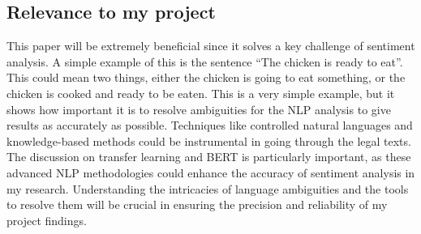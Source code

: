 \subsection{Relevance to my project}
This paper will be extremely beneficial since it solves a key challenge of sentiment analysis. A simple example of this is the sentence ``The chicken is ready to eat''. This could mean two things, either the chicken is going to eat something, or the chicken is cooked and ready to be eaten. This is a very simple example, but it shows how important it is to resolve ambiguities for the NLP analysis to give results as accurately as possible. Techniques like controlled natural languages and knowledge-based methods could be instrumental in going through the legal texts. The discussion on transfer learning and BERT is particularly important, as these advanced NLP methodologies could enhance the accuracy of sentiment analysis in my research. Understanding the intricacies of language ambiguities and the tools to resolve them will be crucial in ensuring the precision and reliability of my project findings.